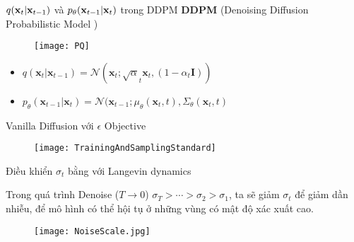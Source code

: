 \begin{frame}{$q(\mathbf{x}_t | \mathbf{x}_{t-1})$ và $p_{\theta}(\mathbf{x}_{t-1} | \mathbf{x}_t ) $  trong DDPM }
	\textbf{DDPM} (Denoising Diffusion Probabilistic Model \cite{ho2020denoisingdiffusionprobabilisticmodels})
\begin{figure}
	\centering
	\texttt{[image: PQ]}
\end{figure}
	
\begin{itemize}
	\item $q (\mathbf{x}_{t} | \mathbf{x}_{t-1}) = \mathcal{N}(\mathbf{x}_t; \sqrt{\alpha}_t \mathbf{x}_t, (1 - \alpha_t \mathbf{I}))$
	\item $p_\theta (\mathbf{x}_{t-1} | \mathbf{x}_{t}) = \mathcal{N}(\mathbf{x}_{t-1}; \mu_\theta{(\mathbf{x}_t, t)}, {\Sigma}_{\theta} {  (\mathbf{x}_t, t ) }$
\end{itemize}
%
%
%

\end{frame}

\begin{frame}{Vanilla Diffusion với $\epsilon$ Objective}
	\begin{figure}
		\centering
		\texttt{[image: TrainingAndSamplingStandard]}
	\end{figure}
\end{frame}

\begin{frame}{Điều khiển $\sigma_t$ bằng với Langevin dynamics}
	
Trong quá trình Denoise ($T \rightarrow 0$)  $\sigma_T > \cdots  >  \sigma_2 > \sigma_1$, ta sẽ giảm $\sigma_t$ để giảm dần nhiễu, để mô hình có thể hội tụ ở những vùng có mật độ xác xuất cao.
	\begin{figure}
		\centering
		\texttt{[image: NoiseScale.jpg]}
	\end{figure}
\end{frame}

